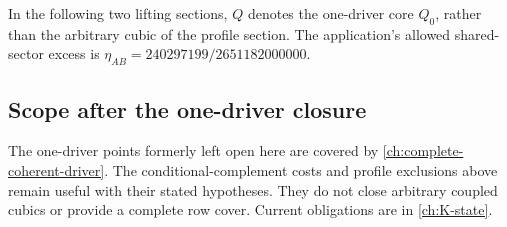 In the following two lifting sections, $Q$ denotes the one-driver core
$Q_0$, rather than the arbitrary cubic of the profile section. The
application's allowed shared-sector excess is
$\eta_{AB}=240297199/2651182000000$.



\subsection{Scope after the one-driver closure}
The one-driver points formerly left open here are covered by
\autoref{ch:complete-coherent-driver}. The conditional-complement costs and
profile exclusions above remain useful with their stated hypotheses.
They do not close arbitrary coupled cubics or provide a complete row
cover. Current obligations are in \autoref{ch:K-state}.
